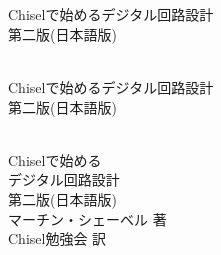 \documentclass[%
    10pt,
    headinclude, footexclude,
    openright, %
    notitlepage,
    cleardoubleempty,
    headsepline,
    pointlessnumbers,
    bibtotoc, idxtotoc,
    ]{scrbook}
\newif\ifbook
\begin{document}
\ifbook
\else

\newpage
\thispagestyle{empty}
~
\newpage
\fi

\begin{flushleft}
\pagestyle{empty}
\ \\
\vspace{1cm}
{\mdseries\huge Chiselで始めるデジタル回路設計}
\ \\
\vspace{1cm}
{\mdseries\Large 第二版(日本語版)}
\cleardoublepage
\end{flushleft}
\newpage

\begin{flushleft}
\pagestyle{empty}
\ \\
\vspace{1cm}
{\mdseries\huge Chiselで始めるデジタル回路設計}
\ \\
\vspace{1cm}
{\mdseries\Large 第二版(日本語版)}
\cleardoublepage
\end{flushleft}

\begin{flushleft}
\pagestyle{empty}
\ \\
\vspace{1cm}
{\Huge Chiselで始める\\デジタル回路設計\\
\bigskip
{\huge 第二版(日本語版)}\\
\bigskip
\bigskip
\bigskip
\bigskip
\bigskip
{\huge マーチン・シェーベル 著\\Chisel勉強会 訳}
\medskip\\
}

\newpage
\end{flushleft}
\end{document}
